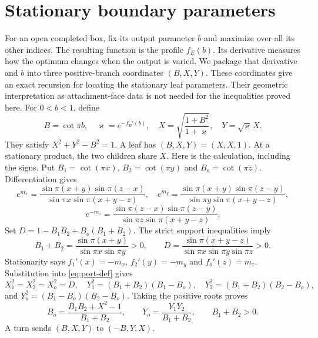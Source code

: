 \documentclass[11pt]{article}
\numberwithin{equation}{section}
\theoremstyle{definition}\newtheorem{definition}[theorem]{Definition}
\theoremstyle{remark}\newtheorem{remark}[theorem]{Remark}
\begin{document}
\section{Stationary boundary parameters}\label{nt:boundary}

For an open completed box, fix its output parameter $b$ and maximize over all its other indices. The resulting function is the profile $f_E(b)$. Its derivative measures how the optimum changes when the output is varied. We package that derivative and $b$ into three positive-branch coordinates $(B,X,Y)$. These coordinates give an exact recursion for locating the stationary leaf parameters. Their geometric interpretation as attachment-face data is not needed for the inequalities proved here.
For $0<b<1$, define
\begin{equation}\label{eq:port-def}
 B=\cot\pi b,\quad \varkappa=e^{-f_E'(b)},\quad
 X=\sqrt{\frac{1+B^2}{1+\varkappa}},\quad Y=\sqrt{\varkappa}\,X.
\end{equation}
They satisfy $X^2+Y^2-B^2=1$. A leaf has $(B,X,Y)=(X,X,1)$. At a stationary product, the two children share $X$. Here is the
calculation, including the signs. Put $B_1=\cot(\pi x)$,
$B_2=\cot(\pi y)$ and $B_o=\cot(\pi z)$. Differentiation gives
\[
 e^{m_x}=\frac{\sin\pi(x+y)\sin\pi(z-x)}
                 {\sin\pi x\sin\pi(x+y-z)},\quad
 e^{m_y}=\frac{\sin\pi(x+y)\sin\pi(z-y)}
                 {\sin\pi y\sin\pi(x+y-z)},
\]
\[
 e^{-m_z}=\frac{\sin\pi(z-x)\sin\pi(z-y)}
                  {\sin\pi z\sin\pi(x+y-z)}.
\]
Set $D=1-B_1B_2+B_o(B_1+B_2)$.
The strict support inequalities imply
\[
 B_1+B_2=\frac{\sin\pi(x+y)}{\sin\pi x\sin\pi y}>0,
 \qquad
 D=\frac{\sin\pi(x+y-z)}{\sin\pi x\sin\pi y\sin\pi z}>0.
\]
Stationarity says $f_1'(x)=-m_x$, $f_2'(y)=-m_y$ and
$f_o'(z)=m_z$. Substitution into \eqref{eq:port-def} gives
\[
 X_1^2=X_2^2=X_o^2=D,\quad
 Y_1^2=(B_1+B_2)(B_1-B_o),\quad
 Y_2^2=(B_1+B_2)(B_2-B_o),
\]
and $Y_o^2=(B_1-B_o)(B_2-B_o)$. Taking the positive roots proves
\begin{equation}\label{eq:port-product}
 B_o=\frac{B_1B_2+X^2-1}{B_1+B_2},\qquad
 Y_o=\frac{Y_1Y_2}{B_1+B_2},\qquad B_1+B_2>0.
\end{equation}
A turn sends $(B,X,Y)$ to $(-B,Y,X)$.
\end{document}
